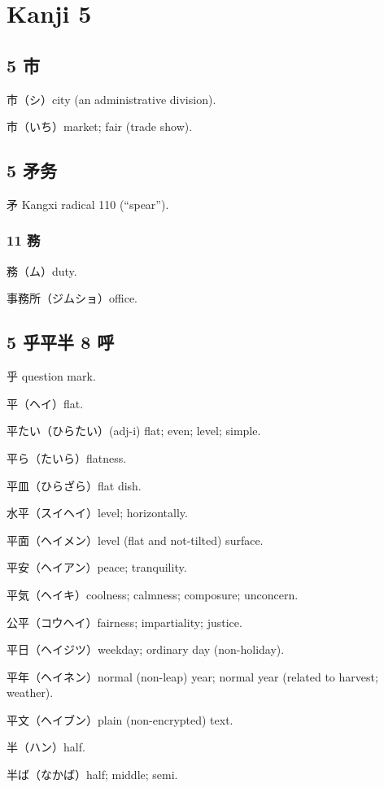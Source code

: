 \chapter{Kanji 5}

\section{5 市}

市（シ）city (an administrative division).

市（いち）market; fair (trade show).

\section{5 矛务}

矛 Kangxi radical 110 (``spear'').

\subsection{11 務}

務（ム）duty.

事務所（ジムショ）office.

\section{5 乎平半 8 呼}

乎 question mark.

平（ヘイ）flat.

平たい（ひらたい）(adj-i) flat; even; level; simple.

平ら（たいら）flatness.

平皿（ひらざら）flat dish.

水平（スイヘイ）level; horizontally.

平面（ヘイメン）level (flat and not-tilted) surface.

平安（ヘイアン）peace; tranquility.

平気（ヘイキ）coolness; calmness; composure; unconcern.

公平（コウヘイ）fairness; impartiality; justice.

平日（ヘイジツ）weekday; ordinary day (non-holiday).

平年（ヘイネン）normal (non-leap) year; normal year (related to harvest; weather).

平文（ヘイブン）plain (non-encrypted) text.

半（ハン）half.

半ば（なかば）half; middle; semi.

